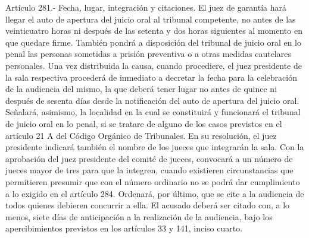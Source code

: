     Artículo 281.- Fecha, lugar, integración y citaciones. El juez de garantía hará llegar el auto de apertura del juicio oral al tribunal competente, no antes de las veinticuatro horas ni después de las setenta y dos horas siguientes al momento en que quedare firme.
    También pondrá a disposición del tribunal de juicio oral en lo penal las personas sometidas a prisión preventiva o a otras medidas cautelares personales.
    Una vez distribuida la causa, cuando procediere, el juez presidente de la sala respectiva procederá de inmediato a decretar la fecha para la celebración de la audiencia del mismo, la que deberá tener lugar no antes de quince ni después de sesenta días desde la notificación del auto de apertura del juicio oral.
    Señalará, asimismo, la localidad en la cual se constituirá y funcionará el tribunal de juicio oral en lo penal, si se tratare de alguno de los casos previstos en el artículo 21 A del Código Orgánico de Tribunales.
    En su resolución, el juez presidente indicará también el nombre de los jueces que integrarán la sala. Con la aprobación del juez presidente del comité de jueces, convocará a un número de jueces mayor de tres para que la integren, cuando existieren circunstancias que permitieren presumir que con el número ordinario no se podrá dar cumplimiento a lo exigido en el artículo 284.
    Ordenará, por último, que se cite a la audiencia de todos quienes debieren concurrir a ella. El acusado deberá ser citado con, a lo menos, siete días de anticipación a la realización de la audiencia, bajo los apercibimientos previstos en los artículos 33 y 141, inciso cuarto.


